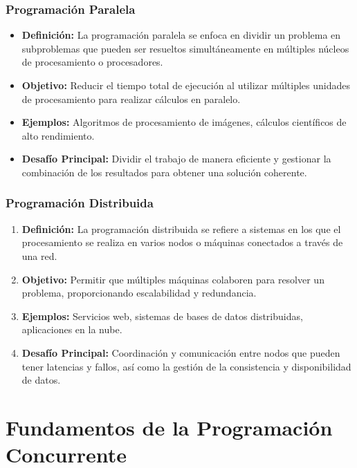 \documentclass{beamer}
\begin{document}
\begin{frame}
  \frametitle{Programación Paralela}
  \begin{alertblock}
      

  \begin{itemize}
    \item \textbf{Definición:} La programación paralela se enfoca en dividir un problema en subproblemas que pueden ser resueltos simultáneamente en múltiples núcleos de procesamiento o procesadores.\pause
    \item \textbf{Objetivo:} Reducir el tiempo total de ejecución al utilizar múltiples unidades de procesamiento para realizar cálculos en paralelo.\pause
    \item \textbf{Ejemplos:} Algoritmos de procesamiento de imágenes, cálculos científicos de alto rendimiento.
    \item \textbf{Desafío Principal:} Dividir el trabajo de manera eficiente y gestionar la combinación de los resultados para obtener una solución coherente.
  \end{itemize}
  \end{alertblock}
\end{frame}

\begin{frame}
\begin{alertblock}
    

  \frametitle{Programación Distribuida}
  \begin{enumerate}
      
    \item \textbf{Definición:} La programación distribuida se refiere a sistemas en los que el procesamiento se realiza en varios nodos o máquinas conectados a través de una red.\pause
    \item \textbf{Objetivo:} Permitir que múltiples máquinas colaboren para resolver un problema, proporcionando escalabilidad y redundancia.\pause
    \item \textbf{Ejemplos:} Servicios web, sistemas de bases de datos distribuidas, aplicaciones en la nube.\pause
    \item \textbf{Desafío Principal:} Coordinación y comunicación entre nodos que pueden tener latencias y fallos, así como la gestión de la consistencia y disponibilidad de datos.
  \end{enumerate}
  \end{alertblock}
\end{frame}


\section{Fundamentos de la Programación Concurrente}
\end{document}
